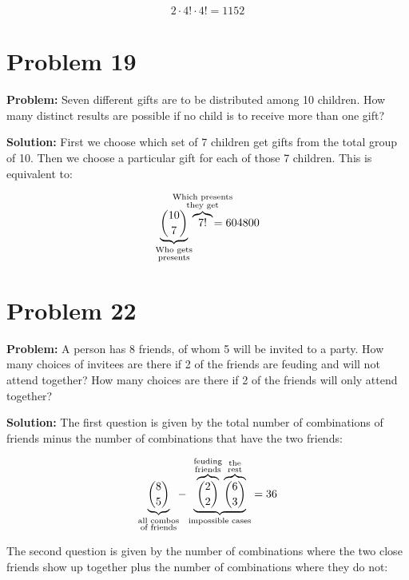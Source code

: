\documentclass{article}
\begin{document}
\begin{equation*}
    2\cdot4!\cdot4!=1152
\end{equation*}

\section*{Problem 19}
\noindent\textbf{Problem:} Seven different gifts are to be distributed among 10 children. How many distinct results are possible if no child is to receive more than one gift?
\bigskip

\noindent\textbf{Solution:} First we choose which set of 7 children get gifts from the total group of 10. Then we choose a particular gift for each of those 7 children. This is equivalent to:

\begin{equation*}
    \underbrace{\binom{10}{7}}_{\substack{\text{Who gets}\\\text{presents}}}\mkern-35mu\overbrace{7!}^{\substack{\text{Which presents}\\\text{they get}}}\mkern-35mu=604800
\end{equation*}

\section*{Problem 22}
\noindent\textbf{Problem:} A person has 8 friends, of whom 5 will be invited to a party. How many choices of invitees are there if 2 of the friends are feuding and will not attend together? How many choices are there if 2 of the friends will only attend together?
\bigskip

\noindent\textbf{Solution:} The first question is given by the total number of combinations of friends minus the number of combinations that have the two friends:

\begin{equation*}
    \underbrace{\binom{8}{5}}_{\substack{\text{all combos}\\ \text{of friends}}}\mkern-5mu-\underbrace{\overbrace{\binom{2}{2}}^{\substack{\text{feuding}\\ \text{friends}}}\overbrace{\binom{6}{3}}^{\substack{\text{the}\\ \text{rest}}}}_{\text{impossible cases}}=36
\end{equation*}
\bigskip

The second question is given by the number of combinations where the two close friends show up together plus the number of combinations where they do not:
\end{document}

